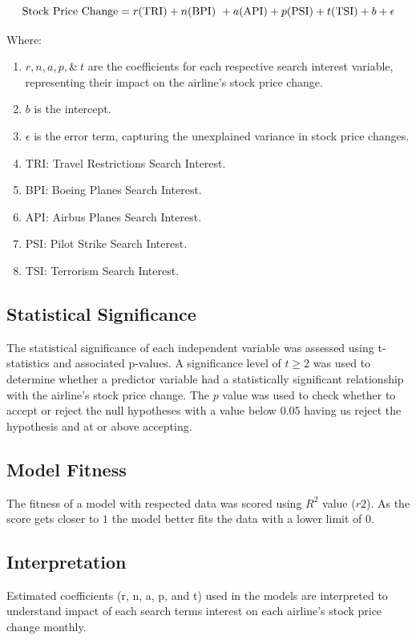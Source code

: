 \documentclass[12pt]{report}
\begin{document}
\[ \text{Stock Price Change} =   r\text{(TRI)} + n\text{(BPI) }+\\ a\text{(API)} + p\text{(PSI)} + t\text{(TSI)} + b + \epsilon\]

Where:
\begin{enumerate}
    \item $r, n,a, p, \&  \ t $ are the coefficients for each respective search interest variable, representing their impact on the airline's stock price change.
    \item $b$ is the intercept.
    \item $\epsilon$ is the error term, capturing the unexplained variance in stock price changes.
    \item TRI: Travel Restrictions Search Interest.
    \item BPI: Boeing Planes Search Interest.
    \item API: Airbus Planes Search Interest.
    \item PSI: Pilot Strike Search Interest.
    \item TSI: Terrorism Search Interest.

\end{enumerate}

\subsection*{Statistical Significance}


The statistical significance of each independent variable
was assessed using t-statistics and associated p-values. A significance level
of $t\geq 2$ was used to determine whether a predictor variable had a
statistically significant relationship with the airline's stock price change. The $p$ value was used to check whether to accept or reject the null hypotheses with a value below $0.05$ having us reject the hypothesis and at or above accepting.


\subsection*{Model Fitness}
The fitness of a model with respected data was scored using $R^2$ value ($r2$). As the score gets closer to $1$ the model better fits the data with a lower limit of 0.
\subsection*{Interpretation}
Estimated coefficients (r, n, a, p, and t) used in the models are interpreted to understand impact of each search terms interest on each airline's stock price change monthly.
\end{document}
